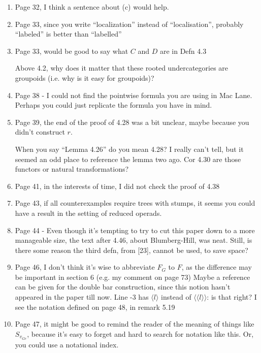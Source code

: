 \documentclass{article}
\begin{document}
\begin{enumerate}
	\item
	Page 32, I think a sentence about (c) would help.
	
	\item
	Page 33, since you write ``localization'' instead of ``localisation'', probably ``labeled'' is better than ``labelled''
	
	\item
	Page 33, would be good to say what $C$ and $D$ are in Defn 4.3
	
	Above 4.2, why does it matter that these rooted undercategories are groupoids (i.e. why is it easy for groupoids)?
	
	\item
	Page 38 - I could not find the pointwise formula you are using in Mac Lane. Perhaps you could just replicate the formula you have in mind.
	
	\item
	Page 39, the end of the proof of 4.28 was a bit unclear, maybe because you didn't construct $r$.
	
	When you say ``Lemma 4.26'' do you mean 4.28? I really can't tell, but it seemed an odd place to reference the lemma two ago.
	Cor 4.30 are those functors or natural transformations?
	
	\item
	Page 41, in the interests of time, I did not check the proof of 4.38
	
	\item
	Page 43, if all counterexamples require trees with stumps, it seems you could have a result in the setting of reduced operads.
	
	\item
	Page 44 - Even though it's tempting to try to cut this paper down to a more manageable size, the text after 4.46, about Blumberg-Hill, was neat. Still, is there some reason the third defn, from [23], cannot be used, to save space?
	
	\item
	Page 46, I don't think it's wise to abbreviate $F_G$ to $F$, as the difference may be important in section 6 (e.g. my comment on page 73)
	Maybe a reference can be given for the double bar construction, since this notion hasn't appeared in the paper till now.
	Line -3 has $\langle l \rangle$ instead of 
	$\langle \langle l \rangle \rangle$: is that right? I see the notation defined on page 48, in remark 5.19
	
	\item
	Page 47, it might be good to remind the reader of the meaning of things like $S_{v_{G e}}$, because it's easy to forget and hard to search for notation like this. Or, you could use a notational index.
	

\end{enumerate}
\end{document}
